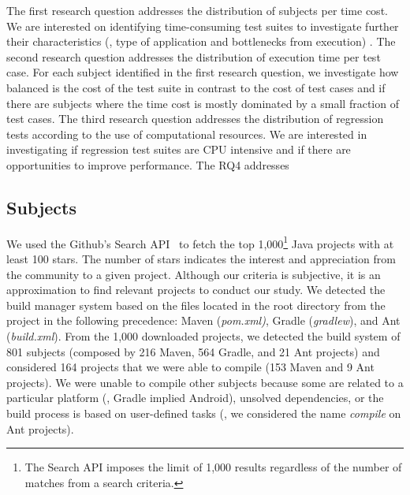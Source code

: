 The first research question addresses the distribution of subjects per
time cost. We are interested on identifying time-consuming test suites
to investigate further their characteristics (\eg, type of application
and bottlenecks from execution) .  The
second research question addresses the distribution of execution time
per test case. For each subject identified in the first research
question, we investigate how balanced is the cost of the test suite in
contrast to the cost of test cases and if there are subjects where the
time cost is mostly dominated by a small fraction of test cases. The
third research question addresses the distribution of regression tests
according to the use of computational resources. We are interested in
investigating if regression test suites are CPU intensive and if there
are opportunities to improve performance. The RQ4 addresses



\subsection{Subjects}
\label{sec:subjects}

We used the Github's
Search API~\cite{githubsearch} to fetch the top 1,000\footnote{The
Search API imposes the limit of 1,000 results regardless of the number
of matches from a search criteria.} Java projects with at least 100
stars. The number of stars indicates the interest and appreciation
from the community to a given project.
 Although our
criteria is subjective, it is an approximation to find relevant
projects to conduct our study. We detected the build manager system
based on the files located in the root directory from the project in
the following precedence: Maven (\emph{pom.xml)}, Gradle
(\emph{gradlew}), and Ant (\emph{build.xml}).
From the 1,000 downloaded projects, we detected the build system of
801 subjects (composed by 216 Maven, 564 Gradle, and 21 Ant projects)
and considered 164 projects that we were able to compile (153 Maven
and 9 Ant projects).  We were unable to compile other subjects because
some are related to a particular platform (\eg, Gradle implied
Android), unsolved dependencies, or the build process is based on
user-defined tasks (\eg, we considered the name \emph{compile} on Ant
projects).

